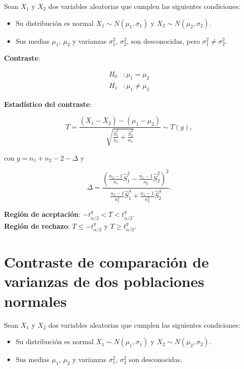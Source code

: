 \documentclass[
  a4paper,
]{scrreport}
\providecommand{\tightlist}{%
  \setlength{\itemsep}{0pt}\setlength{\parskip}{0pt}}\usepackage{longtable,booktabs,array}
\theoremstyle{definition}
\theoremstyle{definition}
\theoremstyle{plain}
\theoremstyle{remark}
\begin{document}
Sean \(X_1\) y \(X_2\) dos variables aleatorias que cumplen las
siguientes condiciones:

\begin{itemize}
\tightlist
\item
  Su distribución es normal \(X_1\sim N(\mu_1,\sigma_1)\) y
  \(X_2\sim N(\mu_2,\sigma_2)\).
\item
  Sus medias \(\mu_1\), \(\mu_2\) y varianzas \(\sigma_1^2\),
  \(\sigma_2^2\), son desconocidas, pero
  \(\sigma^2_1\not = \sigma^2_2\).
\end{itemize}

\textbf{Contraste}:

\[
\begin{aligned}
H_0 &: \mu_1=\mu_2 \\
H_1 &: \mu_1\neq \mu_2
\end{aligned}
\]

\textbf{Estadístico del contraste}:

\[
T=\frac{(\bar{X}_1-\bar{X}_2)-(\mu_1-\mu_2)}{\sqrt{\frac{\hat{S}^2_1}{n_1}+\frac{\hat{S}^2_2}{n_2}}} \sim T(g),
\]

con \(g=n_1+n_2-2-\Delta\) y

\[\Delta = \frac{(\frac{n_2-1}{n_1}\hat{S}_1^2-\frac{n_1-1}{n_2}\hat{S}_2^2)^2}{\frac{n_2-1}{n_1^2}\hat{S}_1^4+\frac{n_1-1}{n_2^2}\hat{S}_2^4}.
\]

\textbf{Región de aceptación}:
\(-t_{\alpha/2}^{g} < T < t_{\alpha/2}^{g}\).\\
\textbf{Región de rechazo}: \(T\leq -t_{\alpha/2}^{g}\) y
\(T\geq t_{\alpha/2}^{g}\).

\hypertarget{contraste-de-comparaciuxf3n-de-varianzas-de-dos-poblaciones-normales}{%
\section{Contraste de comparación de varianzas de dos poblaciones
normales}\label{contraste-de-comparaciuxf3n-de-varianzas-de-dos-poblaciones-normales}}

Sean \(X_1\) y \(X_2\) dos variables aleatorias que cumplen las
siguientes condiciones:

\begin{itemize}
\tightlist
\item
  Su distribución es normal \(X_1\sim N(\mu_1,\sigma_1)\) y
  \(X_2\sim N(\mu_2,\sigma_2)\).
\item
  Sus medias \(\mu_1\), \(\mu_2\) y varianzas \(\sigma_1^2\),
  \(\sigma_2^2\) son desconocidas.
\end{itemize}
\end{document}
